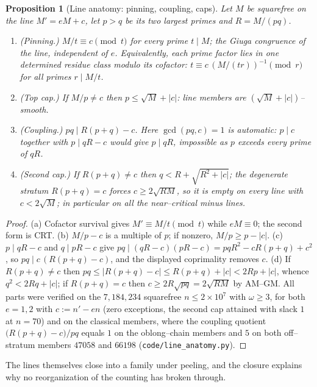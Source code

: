 \documentclass[11pt]{article}
\newtheorem{proposition}[theorem]{Proposition}
\theoremstyle{definition}
\begin{document}
\begin{proposition}[Line anatomy: pinning, coupling, caps]\label{prop:lineanatomy}
Let $M$ be squarefree on the line $M'=eM+c$, let $p>q$ be its two largest primes and $R=M/(pq)$.
\begin{enumerate}[label=\textup{(\alph*)},leftmargin=2.2em]
\item \emph{(Pinning.)} $M/t\equiv c\pmod t$ for \emph{every} prime $t\mid M$; the Giuga
congruence of the line, independent of $e$. Equivalently, each prime factor lies in one determined
residue class modulo its cofactor: $t\equiv c\,(M/(tr))^{-1}\pmod r$ for all primes $r\mid M/t$.
\item \emph{(Top cap.)} If $M/p\neq c$ then $p\le\sqrt M+|c|$: line members are
$(\sqrt M+|c|)$--smooth.
\item \emph{(Coupling.)} $pq\mid R(p+q)-c$. Here $\gcd(pq,c)=1$ is automatic: $p\mid c$ together
with $p\mid qR-c$ would give $p\mid qR$, impossible as $p$ exceeds every prime of $qR$.
\item \emph{(Second cap.)} If $R(p+q)\neq c$ then $q<R+\sqrt{R^2+|c|}$; the degenerate stratum
$R(p+q)=c$ forces $c\ge2\sqrt{RM}$, so it is empty on every line with $c<2\sqrt M$; in
particular on all the near--critical minus lines.
\end{enumerate}
\end{proposition}
\begin{proof}
(a) Cofactor survival gives $M'\equiv M/t\pmod t$ while $eM\equiv0$; the second form is CRT.
(b) $M/p-c$ is a multiple of $p$; if nonzero, $M/p\ge p-|c|$. (c) $p\mid qR-c$ and $q\mid pR-c$
give $pq\mid(qR-c)(pR-c)=pqR^2-cR(p+q)+c^2$, so $pq\mid c\,(R(p+q)-c)$, and the displayed
coprimality removes $c$. (d) If $R(p+q)\neq c$ then $pq\le|R(p+q)-c|\le R(p+q)+|c|<2Rp+|c|$,
whence $q^2<2Rq+|c|$; if $R(p+q)=c$ then $c\ge2R\sqrt{pq}=2\sqrt{RM}$ by AM--GM. All parts were
verified on the $7{,}184{,}234$ squarefree $n\le2\times10^7$ with $\omega\ge3$, for both $e=1,2$
with $c:=n'-en$ (zero exceptions, the second cap attained with slack $1$ at $n=70$) and on
the classical members, where the coupling quotient $\bigl(R(p+q)-c\bigr)/pq$ equals $1$ on the
oblong--chain members and $5$ on both off--stratum members $47058$ and $66198$
(\texttt{code/line\_anatomy.py}).
\end{proof}

The lines themselves close into a family under peeling, and the closure explains why no
reorganization of the counting has broken through.
\end{document}
